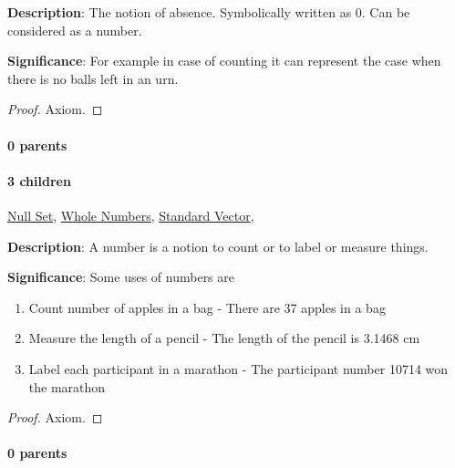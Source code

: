 \documentclass[../main.tex]{subfiles}
\begin{document}
\begin{statement}
\label{statement:Zero}\hspace*{0pt}\par
\end{statement}
\textbf{Description}:
The notion of absence.
Symbolically written as 0.
Can be considered as a number.
\par
{\color{magenta} \textbf{Significance}:
For example in case of counting it can represent the case when there is no balls left in an urn.
\par}
\begin{proof}Axiom.\end{proof}\par
\paragraph{0 parents} 
\paragraph{3 children} \hyperref[statement:Null Set]{Null Set}, \hyperref[statement:Whole Numbers]{Whole Numbers}, \hyperref[statement:Standard Vector]{Standard Vector}, 



\begin{statement}
\label{statement:Number}\hspace*{0pt}\par
\end{statement}
\textbf{Description}:
A number is a notion to count or to label or measure things.
\par
{\color{magenta} \textbf{Significance}:
Some uses of numbers are
\begin{enumerate}[noitemsep,topsep=0pt]
  \item Count number of apples in a bag - There are 37 apples in a bag
  \item Measure the length of a pencil - The length of the pencil is 3.1468 cm
  \item Label each participant in a marathon - The participant number 10714 won the marathon
\end{enumerate}
\par}
\begin{proof}Axiom.\end{proof}\par
\paragraph{0 parents} 
\end{document}

